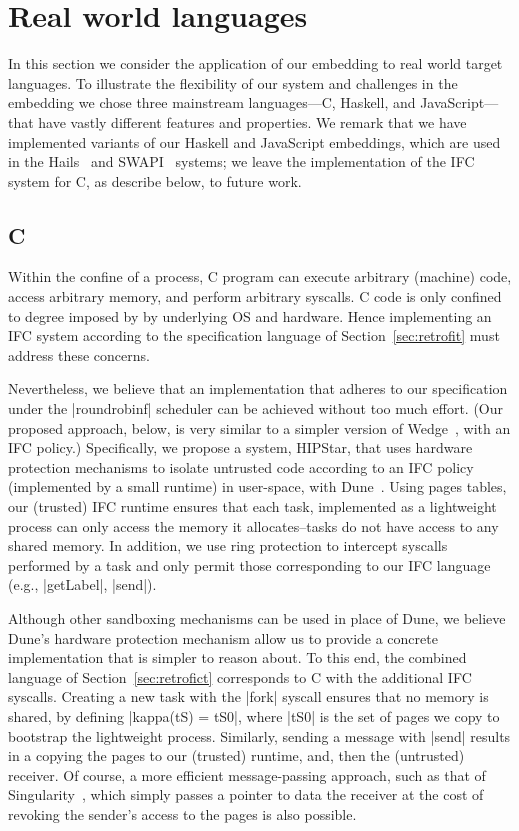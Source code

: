 \section{Real world languages}
\label{sec:real}

In this section we consider the application of our embedding to 
real world target languages.
%
To illustrate the flexibility of our system and challenges in the
embedding we chose three mainstream languages---C, Haskell, and
JavaScript---that have vastly different features and properties.
%
We remark that we have implemented variants of our Haskell and
JavaScript embeddings, which are used in the Hails~\tocite{} and
SWAPI~\tocite{} systems; we leave the implementation of the IFC system
for C, as describe below, to future work.

\subsection{C}
\label{sec:real:c}
%
Within the confine of a process, C program can execute arbitrary
(machine) code, access arbitrary memory, and perform arbitrary
syscalls.
%
C code is only confined to degree imposed by by underlying OS and
hardware.
%
Hence implementing an IFC system according to the specification
language of Section~\ref{sec:retrofit} must address these concerns.

Nevertheless, we believe that an implementation that adheres to our
specification under the |roundrobinf| scheduler can be achieved
without too much effort.
%
(Our proposed approach, below, is very similar to a simpler version of
Wedge~\tocite{}, with an IFC policy.)
%
Specifically, we propose a system, HIPStar, that uses hardware
protection mechanisms to isolate untrusted code according to an IFC
policy (implemented by a small runtime) in user-space, with
Dune~\tocite{}.
%
Using pages tables, our (trusted) IFC runtime ensures that each task,
implemented as a lightweight process can only access the memory it
allocates--tasks do not have access to any shared memory.
%
In addition, we use ring protection to intercept syscalls performed by
a task and only permit those corresponding to our IFC language (e.g.,
|getLabel|, |send|).
%

Although other sandboxing mechanisms can be used in place of Dune, we
believe Dune's hardware protection mechanism allow us to provide a 
concrete implementation that is simpler to reason about.
%
To this end, the combined language of Section~\ref{sec:retrofict}
corresponds to C with the additional IFC syscalls.
%
Creating a new task with the |fork| syscall ensures that no memory is
shared, by defining |kappa(tS) = tS0|, where |tS0| is the set of pages
we copy to bootstrap the lightweight process.
%
Similarly, sending a message with |send| results in a copying the
pages to our (trusted) runtime, and, then the (untrusted) receiver.
%
Of course, a more efficient message-passing approach, such as that of
Singularity~\tocite{}, which simply passes a pointer to data the
receiver at the cost of revoking the sender's access to the pages is
also possible.


